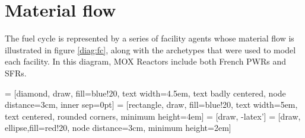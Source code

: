 \section{Material flow}

The fuel cycle is represented by a series of facility agents whose material 
flow is illustrated in figure \ref{diag:fc}, along with
the \Cyclus archetypes that were used to model each facility.
In this diagram, \gls{MOX} Reactors include both French \glspl{PWR} and 
\glspl{SFR}.

 = [diamond, draw, fill=blue!20, 
text width=4.5em, text badly centered, node distance=3cm, inner sep=0pt]
 = [rectangle, draw, fill=blue!20, 
text width=5em, text centered, rounded corners, minimum height=4em]
 = [draw, -latex']
 = [draw, ellipse,fill=red!20, node distance=3cm,
minimum height=2em]


